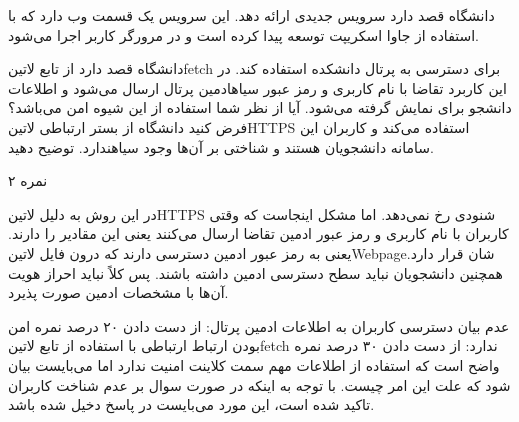 
دانشگاه قصد دارد سرویس جدیدی ارائه دهد.
این سرویس یک قسمت وب دارد که با استفاده از جاوا اسکریپت توسعه پیدا
کرده است و در مرورگر کاربر اجرا می‌شود.

دانشگاه قصد دارد از تابع ‌لاتین{fetch} برای دسترسی به پرتال دانشکده استفاده کند.
در این کاربرد تقاضا با نام کاربری و رمز عبور ‌سیاه{ادمین} پرتال ارسال می‌شود و اطلاعات دانشجو برای نمایش گرفته می‌شود.
آیا از نظر شما استفاده از این شیوه امن می‌باشد؟ فرض کنید دانشگاه از بستر ارتباطی ‌لاتین{HTTPS} استفاده می‌کند و
کاربران این سامانه دانشجویان هستند و شناختی بر آن‌ها وجود ‌سیاه{ندارد}.
توضیح دهید.

۲ نمره


در این روش به دلیل ‌لاتین{HTTPS} شنودی رخ نمی‌دهد.
اما مشکل اینجاست که وقتی کاربران با نام کاربری و رمز عبور ادمین تقاضا ارسال می‌کنند یعنی این مقادیر را دارند. یعنی به رمز عبور ادمین دسترسی دارند که درون فایل ‌لاتین{Webpage}شان قرار دارد.
همچنین دانشجویان نباید سطح دسترسی ادمین داشته باشند. پس کلاً نباید احراز هویت آن‌ها با مشخصات ادمین صورت پذیرد.

 عدم بیان دسترسی کاربران به اطلاعات ادمین پرتال: از دست دادن ۲۰ درصد نمره
 امن بودن ارتباط ارتباطی با استفاده از تابع ‌لاتین{fetch} ندارد: از دست دادن ۳۰ درصد نمره
 واضح است که استفاده از اطلاعات مهم سمت کلاینت امنیت ندارد اما می‌بایست بیان شود که علت این امر چیست.
 با توجه به اینکه در صورت سوال بر عدم شناخت کاربران تاکید شده است، این مورد می‌بایست در پاسخ دخیل شده باشد.

